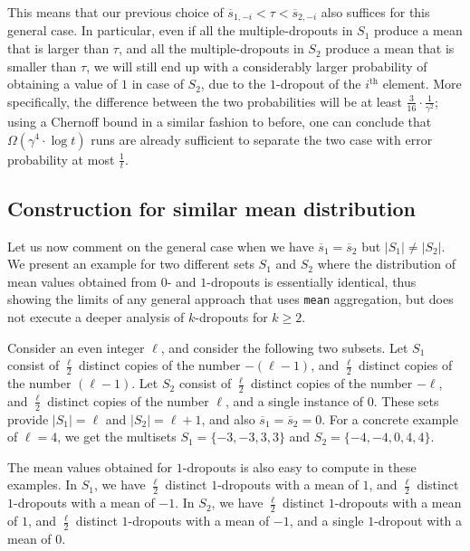 \documentclass{article}
\begin{document}
This means that our previous choice of $\overline{s}_{1, -i}<\tau<\overline{s}_{2, -i}$ also suffices for this general case. In particular, even if all the multiple-dropouts in $S_1$ produce a mean that is larger than $\tau$, and all the multiple-dropouts in $S_2$ produce a mean that is smaller than $\tau$, we will still end up with a considerably larger probability of obtaining a value of $1$ in case of $S_2$, due to the $1$-dropout of the $i^{\text{th}}$ element. More specifically, the difference between the two probabilities will be at least $\frac{3}{16} \cdot \frac{1}{\gamma^2}$; using a Chernoff bound in a similar fashion to before, one can conclude that $\Omega(\gamma^4 \cdot \log t)$ runs are already sufficient to separate the two case with error probability at most $\frac{1}{t}$.

\subsection{Construction for similar mean distribution}

Let us now comment on the general case when we have $\overline{s}_{1} = \overline{s}_{2}$ but $|S_1| \neq |S_2|$. We present an example for two different sets $S_1$ and $S_2$ where the distribution of mean values obtained from $0$- and $1$-dropouts is essentially identical, thus showing the limits of any general approach that uses \texttt{mean} aggregation, but does not execute a deeper analysis of $k$-dropouts for $k \geq 2$.

Consider an even integer $\ell$, and consider the following two subsets. Let $S_1$ consist of $\frac{\ell}{2}$ distinct copies of the number $-(\ell-1)$, and $\frac{\ell}{2}$ distinct copies of the number $(\ell-1)$. Let $S_2$ consist of $\frac{\ell}{2}$ distinct copies of the number $-\ell$, and $\frac{\ell}{2}$ distinct copies of the number $\ell$, and a single instance of $0$. These sets provide $|S_1|=\ell$ and $|S_2|=\ell+1$, and also $\overline{s}_{1} = \overline{s}_{2}=0$. For a concrete example of $\ell=4$, we get the multisets $S_1=\{ -3,-3,3,3 \}$ and $S_2=\{ -4, -4, 0, 4, 4 \}$.

The mean values obtained for $1$-dropouts is also easy to compute in these examples. In $S_1$, we have $\frac{\ell}{2}$ distinct $1$-dropouts with a mean of $1$, and $\frac{\ell}{2}$ distinct $1$-dropouts with a mean of $-1$. In $S_2$, we have $\frac{\ell}{2}$ distinct $1$-dropouts with a mean of $1$, and $\frac{\ell}{2}$ distinct $1$-dropouts with a mean of $-1$, and a single $1$-dropout with a mean of $0$.
\end{document}
